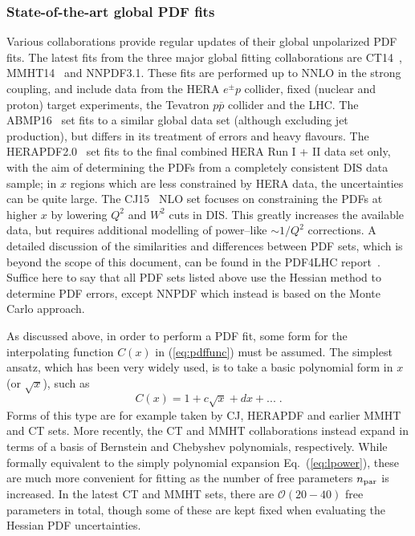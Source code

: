 \subsubsection{State-of-the-art global PDF fits}

Various collaborations provide regular updates of their global unpolarized
PDF fits.
%
The latest fits from the three major global fitting collaborations
are CT14~\cite{Dulat:2015mca}, MMHT14~\cite{Harland-Lang:2014zoa} and NNPDF3.1.
%
These fits are performed up to NNLO in the strong coupling, and include data from the HERA $e^{\pm} p$ collider, fixed (nuclear and proton) target experiments, the Tevatron $p\overline{p}$ collider and the LHC. 
%
The ABMP16~\cite{Alekhin:2017kpj} set fits to a similar global data set
(although excluding jet production), but differs in its treatment of errors and heavy flavours.
%
The HERAPDF2.0~\cite{Abramowicz:2015mha} set fits to the final combined HERA Run I + II data set only, with the aim of determining the PDFs from a completely consistent DIS data sample; in $x$ regions which are less constrained by HERA data, the uncertainties can be quite large. The CJ15~\cite{Accardi:2016qay} NLO set focuses on constraining the PDFs at higher $x$ by lowering $Q^2$ and $W^2$ cuts in DIS. This greatly increases the available data, but requires additional modelling of power--like $\sim 1/Q^2$ corrections.
%
A detailed discussion of the similarities and differences between
PDF sets, which is beyond the scope of this
document,
can be found in the PDF4LHC report~\cite{Butterworth:2015oua}.
%
Suffice here to say that all PDF sets listed above use the Hessian
method to determine PDF errors, except NNPDF which instead
is based on the Monte Carlo approach.

As discussed above, in order to perform a  PDF fit, some form for the interpolating function $C(x)$ in (\ref{eq:pdffunc}) must be assumed.
%
The simplest ansatz, which has been very widely used, is to take a basic polynomial form in $x$ (or $\sqrt{x}$), such as
\begin{equation}\label{eq:lpower}
C(x)=1+c\sqrt{x}+d x+...\;.
\end{equation}
Forms of this type are for example taken by CJ, HERAPDF and earlier MMHT and CT sets. More recently, the CT and MMHT collaborations instead expand in terms of a basis of  Bernstein and Chebyshev polynomials, respectively.
%
While formally equivalent to the simply polynomial expansion
Eq.~(\ref{eq:lpower}), these are much more convenient for fitting as the number of free parameters $n_{\rm par}$ is increased.
%
In the latest CT and MMHT sets, there are $\mathcal{O}(20-40)$ free parameters in total, though some of these are kept fixed when evaluating the
Hessian PDF uncertainties.

